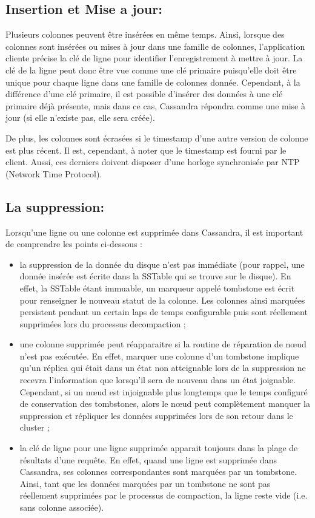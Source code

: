 \subsection{Insertion et Mise a jour:}
Plusieurs colonnes peuvent être insérées en même temps. Ainsi, lorsque des colonnes sont insérées ou mises à jour dans une famille de colonnes, l'application cliente précise la clé de ligne pour identifier l'enregistrement à mettre à jour. La clé de la ligne peut donc être vue comme une clé primaire puisqu'elle doit être unique pour chaque ligne dans une famille de colonnes donnée. Cependant, à la différence d'une clé primaire, il est possible d'insérer des données à une clé primaire déjà présente, mais dans ce cas, Cassandra répondra comme une mise à jour (si elle n'existe pas, elle sera créée).

De plus, les colonnes sont écrasées si le timestamp d'une autre version de colonne est plus récent. Il est, cependant, à noter que le timestamp est fourni par le client. Aussi, ces derniers doivent disposer d'une horloge synchronisée par NTP (Network Time Protocol).

\subsection{La suppression:}
Lorsqu'une ligne ou une colonne est supprimée dans Cassandra, il est important de comprendre les points ci-dessous :

\begin{itemize}[label=\textbullet]
	\item la suppression de la donnée du disque n'est pas immédiate (pour rappel, une donnée insérée est écrite dans la SSTable qui se trouve sur le disque). En effet, la SSTable étant immuable, un marqueur appelé tombstone est écrit pour renseigner le nouveau statut de la colonne. Les colonnes ainsi marquées persistent pendant un certain laps de temps configurable puis sont réellement supprimées lors du processus decompaction ;
	\item une colonne supprimée peut réapparaitre si la routine de réparation de nœud n'est pas exécutée. En effet, marquer une colonne d'un tombstone implique qu'un réplica qui était dans un état non atteignable lors de la suppression ne recevra l'information que lorsqu'il sera de nouveau dans un état joignable. Cependant, si un nœud est injoignable plus longtemps que le temps configuré de conservation des tombstones, alors le nœud peut complètement manquer la suppression et répliquer les données supprimées lors de son retour dans le cluster ;
	\item la clé de ligne pour une ligne supprimée apparait toujours dans la plage de résultats d'une requête. En effet, quand une ligne est supprimée dans Cassandra, ses colonnes correspondantes sont marquées par un tombstone. Ainsi, tant que les données marquées par un tombstone ne sont pas réellement supprimées par le processus de compaction, la ligne reste vide (i.e. sans colonne associée).
\end{itemize}